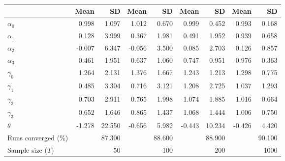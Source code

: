 
\begin{tabular}[t]{lrrrrrrrr}
\toprule
  & Mean & SD & Mean  & SD  & Mean   & SD   & Mean    & SD   \\
\midrule
$\alpha_{0}$ & 0.998 & 1.097 & 1.012 & 0.670 & 0.999 & 0.452 & 0.993 & 0.168\\
$\alpha_{1}$ & 0.128 & 3.999 & 0.367 & 1.981 & 0.491 & 1.952 & 0.939 & 0.658\\
$\alpha_{2}$ & -0.007 & 6.347 & -0.056 & 3.500 & 0.085 & 2.703 & 0.126 & 0.857\\
$\alpha_{3}$ & 0.461 & 1.951 & 0.637 & 1.060 & 0.747 & 0.951 & 0.976 & 0.363\\
$\gamma_{0}$ & 1.264 & 2.131 & 1.376 & 1.667 & 1.243 & 1.213 & 1.298 & 0.775\\
$\gamma_{1}$ & 0.485 & 3.304 & 0.716 & 3.121 & 1.208 & 2.725 & 1.037 & 1.293\\
$\gamma_{2}$ & 0.703 & 2.911 & 0.765 & 1.998 & 1.074 & 1.885 & 1.016 & 0.664\\
$\gamma_{3}$ & 0.652 & 1.646 & 0.865 & 1.437 & 1.068 & 1.444 & 1.006 & 0.750\\
$\theta$ & -1.278 & 22.550 & -0.656 & 5.982 & -0.443 & 10.234 & -0.426 & 4.420\\
Runs converged (\%) &  & 87.300 &  & 88.600 &  & 88.900 &  & 90.100\\
Sample size ($T$) &  & 50 &  & 100 &  & 200 &  & 1000\\
\bottomrule
\end{tabular}
